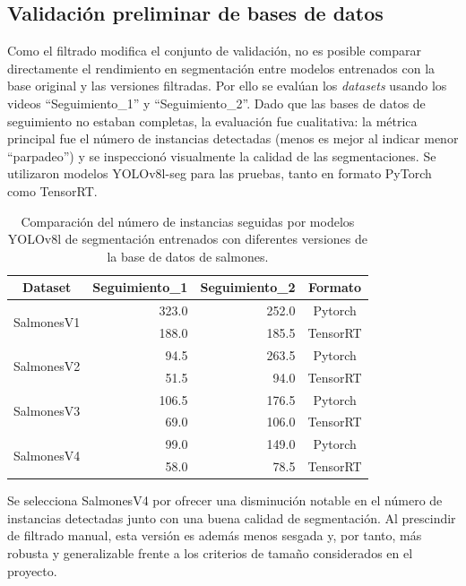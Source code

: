 \subsection{Validación preliminar de bases de datos}
Como el filtrado modifica el conjunto de validación, no es posible comparar directamente el rendimiento en segmentación entre modelos entrenados con la base original y las versiones filtradas. Por ello se evalúan los \textit{datasets} usando los videos ``Seguimiento_1'' y ``Seguimiento_2''. Dado que las bases de datos de seguimiento no estaban completas, la evaluación fue cualitativa: la métrica principal fue el número de instancias detectadas (menos es mejor al indicar menor ``parpadeo'') y se inspeccionó visualmente la calidad de las segmentaciones. Se utilizaron modelos YOLOv8l-seg para las pruebas, tanto en formato PyTorch como TensorRT.

\begin{table}[htbp]
\centering
\caption[Evaluación entre distintas versiones de la base de datos de salmones]{Comparación del número de instancias seguidas por modelos YOLOv8l de segmentación entrenados con diferentes versiones de la base de datos de salmones.}
\label{tab:seguimientos_versiones_dataset}
\begin{tabular}{|c|r|r|c|}
\hline
\textbf{Dataset} & \multicolumn{1}{c|}{\textbf{Seguimiento\_1}} & \multicolumn{1}{c|}{\textbf{Seguimiento\_2}} & \textbf{Formato} \\ \hline
\multirow{2}{*}{SalmonesV1} & 323.0 & 252.0 & Pytorch \\ \cline{2-4} 
 & 188.0 & 185.5 & TensorRT \\ \hline
\multirow{2}{*}{SalmonesV2} & 94.5 & 263.5 & Pytorch \\ \cline{2-4} 
 & 51.5 & 94.0 & TensorRT \\ \hline
\multirow{2}{*}{SalmonesV3} & 106.5 & 176.5 & Pytorch \\ \cline{2-4} 
 & 69.0 & 106.0 & TensorRT \\ \hline
\multirow{2}{*}{SalmonesV4} & 99.0 & 149.0 & Pytorch \\ \cline{2-4} 
 & 58.0 & 78.5 & TensorRT \\ \hline
\end{tabular}
\end{table}

Se selecciona SalmonesV4 por ofrecer una disminución notable en el número de instancias detectadas junto con una buena calidad de segmentación. Al prescindir de filtrado manual, esta versión es además menos sesgada y, por tanto, más robusta y generalizable frente a los criterios de tamaño considerados en el proyecto.

